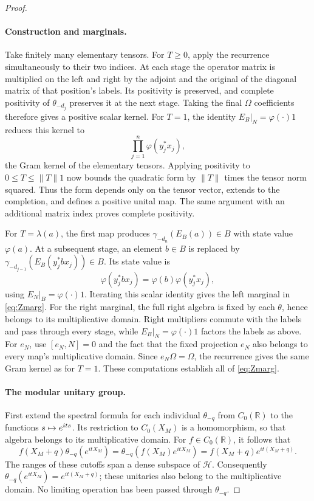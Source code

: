 \documentclass[11pt]{article}
\let\originalmapsto\mapsto
\renewcommand{\mapsto}{\mathrel{\pdfliteral direct{/Span << /ActualText <FEFF21A6> >> BDC}\originalmapsto\pdfliteral direct{EMC}}}
\theoremstyle{definition}
\newcommand{\R}{\mathbb R}
\newcommand{\HH}{\mathcal H}
\begin{document}
\begin{proof}
\leavevmode
\paragraph{Construction and marginals.}
Take finitely many elementary tensors. For $T\ge0$, apply the recurrence
simultaneously to their two indices. At each stage the operator matrix is
multiplied on the left and right by the adjoint and the original of the
diagonal matrix of that position's labels. Its positivity is preserved,
and complete positivity of $\theta_{-d_j}$ preserves it at the next stage.
Taking the final $\Omega$ coefficients therefore gives a positive scalar
kernel. For $T=1$, the identity $E_B|_N=\varphi(\cdot)1$ reduces this kernel
to
\[
 \prod_{j=1}^n\varphi(y_j^*x_j),
\]
the Gram kernel of the elementary tensors. Applying positivity to
$0\le T\le\|T\|1$ now bounds the quadratic form by $\|T\|$ times the tensor
norm squared. Thus the form depends only on the tensor vector, extends to
the completion, and defines a positive unital map. The same argument with
an additional matrix index proves complete positivity.

For $T=\lambda(a)$, the first map produces
$\gamma_{-d_n}(E_B(a))\in B$ with state value $\varphi(a)$. At a subsequent
stage, an element $b\in B$ is replaced by
$\gamma_{-d_{j-1}}(E_B(y_j^*bx_j))\in B$. Its state value is
\[
 \varphi(y_j^*bx_j)=\varphi(b)\varphi(y_j^*x_j),
\]
using $E_N|_B=\varphi(\cdot)1$. Iterating this scalar identity gives the
left marginal in \eqref{eq:Zmarg}. For the right marginal, the full right
algebra is fixed by each $\theta$, hence belongs to its multiplicative
domain. Right multipliers commute with the labels and pass through every
stage, while $E_B|_N=\varphi(\cdot)1$ factors the labels as above. For
$e_N$, use $[e_N,N]=0$ and the fact that the fixed projection $e_N$ also
belongs to every map's multiplicative domain. Since $e_N\Omega=\Omega$,
the recurrence gives the same Gram kernel as for $T=1$. These computations
establish all of \eqref{eq:Zmarg}.

\paragraph{The modular unitary group.}
First extend the spectral formula for each individual $\theta_{-q}$ from
$C_0(\R)$ to the functions $s\mapsto e^{its}$. Its restriction to
$C_0(X_M)$ is a homomorphism, so that algebra belongs to its multiplicative
domain. For $f\in C_0(\R)$, it follows that
\[
 f(X_M+q)\theta_{-q}(e^{itX_M})
 =\theta_{-q}(f(X_M)e^{itX_M})
 =f(X_M+q)e^{it(X_M+q)}.
\]
The ranges of these cutoffs span a dense subspace of $\HH$. Consequently
$\theta_{-q}(e^{itX_M})=e^{it(X_M+q)}$; these unitaries also belong to the
multiplicative domain. No limiting operation has been passed through
$\theta_{-q}$.


\end{proof}
\end{document}
